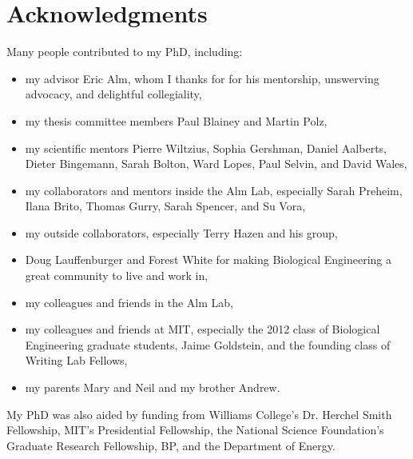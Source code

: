 \cleardoublepage
\setcounter{savepage}{\thepage}
\begin{abstractpage}

\end{abstractpage}

\cleardoublepage

\section*{Acknowledgments}

Many people contributed to my PhD, including:
\begin{itemize}
    \item my advisor Eric Alm, whom I thanks for for his mentorship,
    unswerving advocacy, and delightful collegiality,
    \item my thesis committee members Paul Blainey and Martin Polz,
    \item my scientific mentors Pierre Wiltzius, Sophia Gershman, Daniel Aalberts, 
        Dieter Bingemann, Sarah Bolton, Ward Lopes, Paul Selvin, and David Wales,
    \item my collaborators and mentors inside the Alm Lab, especially Sarah Preheim,
        Ilana Brito, Thomas Gurry, Sarah Spencer, and Su Vora,
    \item my outside collaborators, especially Terry Hazen and his group,
    \item Doug Lauffenburger and Forest White for making Biological Engineering a
        great community to live and work in,
    \item my colleagues and friends in the Alm Lab,
    \item my colleagues and friends at MIT, especially the 2012 class of
        Biological Engineering graduate students, Jaime Goldstein, and the founding class
        of Writing Lab Fellows,
    \item my parents Mary and Neil and my brother Andrew.
\end{itemize}
My PhD was also aided by funding from Williams College's Dr. Herchel Smith
Fellowship, MIT's Presidential Fellowship, the National Science Foundation's
Graduate Research Fellowship, BP, and the Department of Energy.

